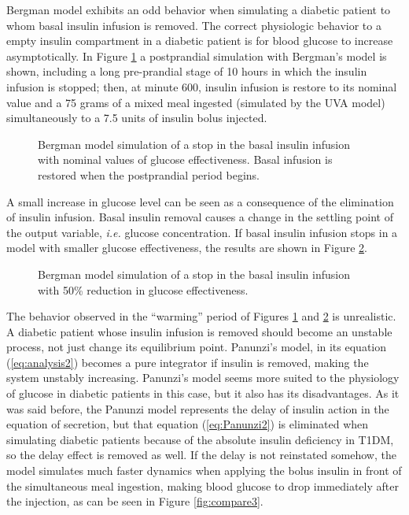 Bergman model exhibits an odd behavior when simulating a diabetic patient to whom basal insulin infusion is removed. The correct physiologic behavior to a empty insulin compartment in a diabetic patient is for blood glucose to increase asymptotically. In Figure \ref{fig:compare1} a postprandial simulation with Bergman's model is shown, including a long pre-prandial stage of 10 hours in which the insulin infusion is stopped; then, at minute 600, insulin infusion is restore to its nominal value and a 75 grams of a mixed meal ingested (simulated by the UVA model) simultaneously to a 7.5 units of insulin bolus injected.

\begin{figure}[hbtp]
\centering
{}\caption{Bergman model simulation of a stop in the basal insulin infusion with nominal values of glucose effectiveness. Basal infusion is restored when the postprandial period begins.}
\label{fig:compare1}
\end{figure}

A small increase in glucose level can be seen as a consequence of the elimination of insulin infusion. Basal insulin removal causes a change in the settling point of the output variable, \textit{i.e.} glucose concentration. If basal insulin infusion stops in a model with smaller glucose effectiveness, the results are shown in Figure \ref{fig:compare2}.

\begin{figure}[hbtp]
\centering
{}\caption{Bergman model simulation of a stop in the basal insulin infusion with 50\% reduction in glucose effectiveness.}
\label{fig:compare2}
\end{figure}

The behavior observed in the ``warming'' period of Figures \ref{fig:compare1} and \ref{fig:compare2} is unrealistic. A diabetic patient whose insulin infusion is removed should become an unstable process, not just change its equilibrium point. Panunzi's model, in its equation (\eqref{eq:analysis2}) becomes a pure integrator if insulin is removed, making the system unstably increasing. Panunzi's model seems more suited to the physiology of glucose in diabetic patients in this case, but it also has its disadvantages. As it was said before, the Panunzi model represents the delay of insulin action in the equation of secretion, but that equation (\eqref{eq:Panunzi2}) is eliminated when simulating diabetic patients because of the absolute insulin deficiency in T1DM, so the delay effect is removed as well. If the delay is not reinstated somehow, the model simulates much faster dynamics when applying the bolus insulin in front of the simultaneous meal ingestion, making blood glucose to drop immediately after the injection, as can be seen in Figure \ref{fig:compare3}.

